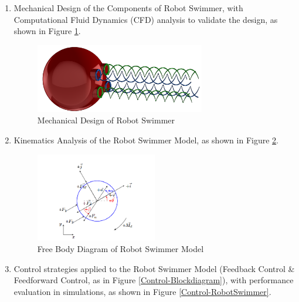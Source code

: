 \documentclass[12pt]{article}
\begin{document}
\begin{enumerate}

    \item {Mechanical Design of the Components of Robot Swimmer, with Computational Fluid Dynamics (CFD) analysis to validate the design, as shown in Figure \ref*{Design-RobotSwimmer}. }
    
    \begin{figure}[H]
        \centering
        \includegraphics*[width = 0.7\textwidth]{portfolio/overview new.png}
        \caption{Mechanical Design of Robot Swimmer}
        \label{Design-RobotSwimmer}
    \end{figure}
    
    \item {Kinematics Analysis of the Robot Swimmer Model, as shown in Figure \ref*{FBD-RobotSwimmer}.}
    
    \begin{figure}[H]
        \centering
        \includegraphics*[width = 0.5\textwidth]{portfolio/FBD_RobotSwimmer.png}
        \caption{Free Body Diagram of Robot Swimmer Model}
        \label{FBD-RobotSwimmer}
    \end{figure}

    \item {Control strategies applied to the Robot Swimmer Model (Feedback Control \& Feedforward Control, as in Figure \ref{Control-Blockdiagram}), with performance evaluation in simulations, as shown in Figure \ref{Control-RobotSwimmer}.}


\end{enumerate}
\end{document}
